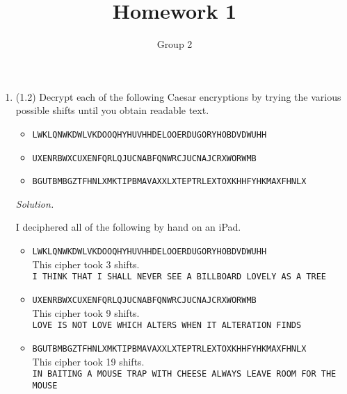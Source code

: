 \documentclass[12pt]{amsart}
\theoremstyle{definition}
\begin{document}
\title{Homework 1}
\author{Group 2}

\maketitle

\begin{enumerate}
	\item (1.2) Decrypt each of the following Caesar encryptions by trying the various 
	possible shifts until you obtain readable text.
	\begin{itemize}
		\item \texttt{LWKLQNWKDWLVKDOOQHYHUVHHDELOOERDUGORYHOBDVDWUHH}
		\item \texttt{UXENRBWXCUXENFQRLQJUCNABFQNWRCJUCNAJCRXWORWMB}
		\item \texttt{BGUTBMBGZTFHNLXMKTIPBMAVAXXLXTEPTRLEXTOXKHHFYHKMAXFHNLX}
	\end{itemize}
	
	\medskip

	\textit{Solution.}

	I deciphered all of the following by hand on an iPad.
		\begin{itemize}
			\item \texttt{LWKLQNWKDWLVKDOOQHYHUVHHDELOOERDUGORYHOBDVDWUHH} \\
                This cipher took 3 shifts. \\
                \texttt{I THINK THAT I SHALL NEVER SEE A BILLBOARD LOVELY AS A TREE}
			\item \texttt{UXENRBWXCUXENFQRLQJUCNABFQNWRCJUCNAJCRXWORWMB} \\
                This cipher took 9 shifts. \\
                \texttt{LOVE IS NOT LOVE WHICH ALTERS WHEN IT ALTERATION FINDS}
			\item \texttt{BGUTBMBGZTFHNLXMKTIPBMAVAXXLXTEPTRLEXTOXKHHFYHKMAXFHNLX}\\
                This cipher took 19 shifts. \\
                \texttt{IN BAITING A MOUSE TRAP WITH CHEESE ALWAYS LEAVE ROOM FOR THE MOUSE}
		\end{itemize}

  \bigskip


\end{enumerate}
\end{document}
